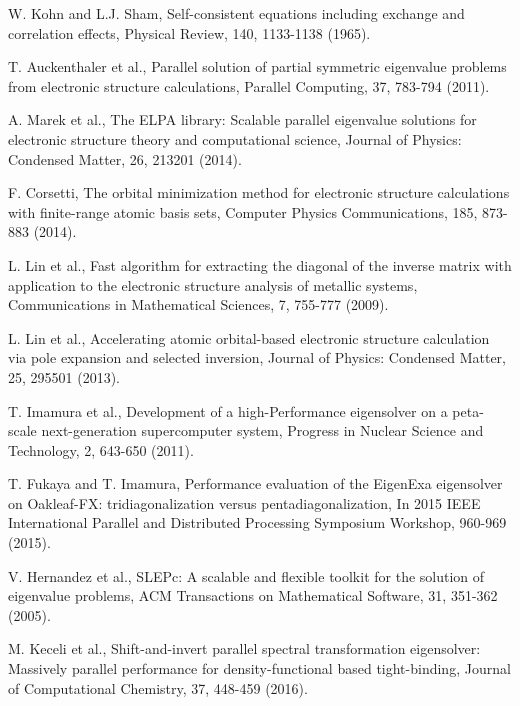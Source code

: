 \documentclass{report}
\begin{document}
\begin{thebibliography}{9}
W. Kohn and L.J. Sham, Self-consistent equations including exchange and correlation effects, Physical Review, 140, 1133-1138 (1965).

T. Auckenthaler et al., Parallel solution of partial symmetric eigenvalue problems from electronic structure calculations, Parallel Computing, 37, 783-794 (2011).

A. Marek et al., The ELPA library: Scalable parallel eigenvalue solutions for electronic structure theory and computational science, Journal of Physics: Condensed Matter, 26, 213201 (2014).

F. Corsetti, The orbital minimization method for electronic structure calculations with finite-range atomic basis sets, Computer Physics Communications, 185, 873-883 (2014).

L. Lin et al., Fast algorithm for extracting the diagonal of the inverse matrix with application to the electronic structure analysis of metallic systems, Communications in Mathematical Sciences, 7, 755-777 (2009).

L. Lin et al., Accelerating atomic orbital-based electronic structure calculation via pole expansion and selected inversion, Journal of Physics: Condensed Matter, 25, 295501 (2013).

T. Imamura et al., Development of a high-Performance eigensolver on a peta-scale next-generation supercomputer system, Progress in Nuclear Science and Technology, 2, 643-650 (2011).

T. Fukaya and T. Imamura, Performance evaluation of the EigenExa eigensolver on Oakleaf-FX: tridiagonalization versus pentadiagonalization, In 2015 IEEE International Parallel and Distributed Processing Symposium Workshop, 960-969 (2015).

V. Hernandez et al., SLEPc: A scalable and flexible toolkit for the solution of eigenvalue problems,
ACM Transactions on Mathematical Software, 31, 351-362 (2005).

M. Keceli et al., Shift-and-invert parallel spectral transformation eigensolver: Massively parallel performance for density-functional based tight-binding, Journal of Computational Chemistry, 37, 448-459 (2016).


\end{thebibliography}
\end{document}
